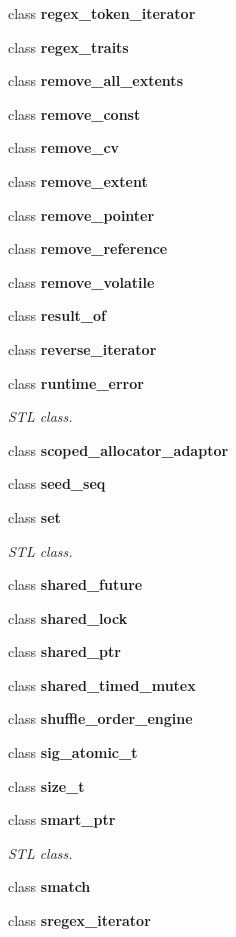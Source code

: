 \begin{DoxyCompactItemize}
class \textbf{ regex\+\_\+token\+\_\+iterator}
\item 
class \textbf{ regex\+\_\+traits}
\item 
class \textbf{ remove\+\_\+all\+\_\+extents}
\item 
class \textbf{ remove\+\_\+const}
\item 
class \textbf{ remove\+\_\+cv}
\item 
class \textbf{ remove\+\_\+extent}
\item 
class \textbf{ remove\+\_\+pointer}
\item 
class \textbf{ remove\+\_\+reference}
\item 
class \textbf{ remove\+\_\+volatile}
\item 
class \textbf{ result\+\_\+of}
\item 
class \textbf{ reverse\+\_\+iterator}
\item 
class \textbf{ runtime\+\_\+error}
\begin{DoxyCompactList}\small\item\em S\+TL class. \end{DoxyCompactList}\item 
class \textbf{ scoped\+\_\+allocator\+\_\+adaptor}
\item 
class \textbf{ seed\+\_\+seq}
\item 
class \textbf{ set}
\begin{DoxyCompactList}\small\item\em S\+TL class. \end{DoxyCompactList}\item 
class \textbf{ shared\+\_\+future}
\item 
class \textbf{ shared\+\_\+lock}
\item 
class \textbf{ shared\+\_\+ptr}
\item 
class \textbf{ shared\+\_\+timed\+\_\+mutex}
\item 
class \textbf{ shuffle\+\_\+order\+\_\+engine}
\item 
class \textbf{ sig\+\_\+atomic\+\_\+t}
\item 
class \textbf{ size\+\_\+t}
\item 
class {\bfseries smart\+\_\+ptr}
\begin{DoxyCompactList}\small\item\em S\+TL class. \end{DoxyCompactList}\item 
class \textbf{ smatch}
\item 
class \textbf{ sregex\+\_\+iterator}
\item 

\end{DoxyCompactItemize}
